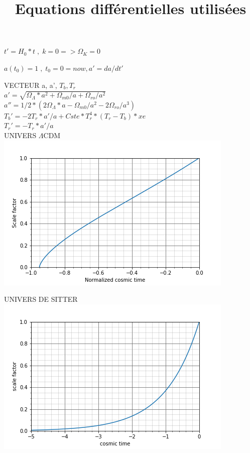 \documentclass[12pt, a4paper]{article}
\date{}
\begin{document}
\title{Equations différentielles utilisées}
\maketitle

\smallskip

\Large $t' = H_0*t \;,\; k=0 => \Omega_K=0$

$ a(t_0)=1 \;,\; t_0 = 0 = now, a' = da/dt'$ 

\medskip
VECTEUR a, a', $T_b, T_r$
\\
$a' = \sqrt{\Omega_{\Lambda}*a^2+\Omega_{m0}/a+\Omega_{ro}/a^2}$
\\
$a'' = 1/2*(2\Omega_{\Lambda}*a-\Omega_{m0}/a^2-2\Omega_{ro}/a^3)$
\\
$T_b' = -2T_r*a'/a+Cste*T_r^4*(T_r-T_b)*xe$
\\
$T_r' = -T_r*a'/a$
\\

UNIVERS $\Lambda$CDM
\\
\includegraphics{Scale_factor}
\newpage

UNIVERS DE SITTER
\\
\includegraphics{DeSitter}
\end{document}
